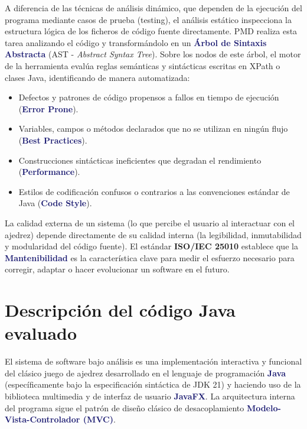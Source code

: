 \documentclass[12pt,a4paper]{article}
\newcommand{\key}[1]{\textbf{\textcolor{MidnightBlue}{#1}}}
\newcommand{\norma}[1]{\textbf{\textcolor{BrickRed}{#1}}}
\begin{document}
A diferencia de las técnicas de análisis dinámico, que dependen de la ejecución del programa mediante casos de prueba (testing), el análisis estático inspecciona la estructura lógica de los ficheros de código fuente directamente. PMD realiza esta tarea analizando el código y transformándolo en un \key{Árbol de Sintaxis Abstracta} (AST - \textit{Abstract Syntax Tree}). Sobre los nodos de este árbol, el motor de la herramienta evalúa reglas semánticas y sintácticas escritas en XPath o clases Java, identificando de manera automatizada:
\begin{itemize}
    \item Defectos y patrones de código propensos a fallos en tiempo de ejecución (\key{Error Prone}).
    \item Variables, campos o métodos declarados que no se utilizan en ningún flujo (\key{Best Practices}).
    \item Construcciones sintácticas ineficientes que degradan el rendimiento (\key{Performance}).
    \item Estilos de codificación confusos o contrarios a las convenciones estándar de Java (\key{Code Style}).
\end{itemize}

\begin{conceptbox}
La calidad externa de un sistema (lo que percibe el usuario al interactuar con el ajedrez) depende directamente de su calidad interna (la legibilidad, inmutabilidad y modularidad del código fuente). El estándar \norma{ISO/IEC 25010} establece que la \key{Mantenibilidad} es la característica clave para medir el esfuerzo necesario para corregir, adaptar o hacer evolucionar un software en el futuro.
\end{conceptbox}

\section{Descripción del código Java evaluado}

El sistema de software bajo análisis es una implementación interactiva y funcional del clásico juego de ajedrez desarrollado en el lenguaje de programación \key{Java} (específicamente bajo la especificación sintáctica de JDK 21) y haciendo uso de la biblioteca multimedia y de interfaz de usuario \key{JavaFX}. La arquitectura interna del programa sigue el patrón de diseño clásico de desacoplamiento \key{Modelo-Vista-Controlador (MVC)}. 
\end{document}

